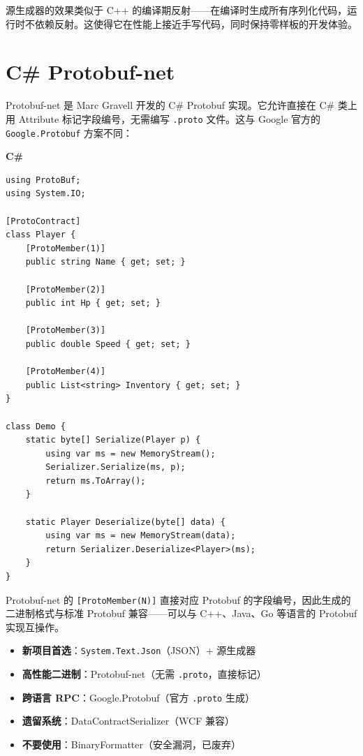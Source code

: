\documentclass[12pt,a4paper,fontset=fandol]{ctexbook}
\newcommand{\Tp}[1]{\texttt{#1}}
\newcommand{\csharplabel}{%
  \noindent\begin{tcolorbox}[colback=csharpheadbg,coltext=white,
    sharp corners,boxrule=0pt,width=3.2em,height=1.4em,
    halign=center,valign=center,nobeforeafter,left=0pt,right=0pt,
    top=0pt,bottom=0pt]\small\bfseries C\#\end{tcolorbox}}
\begin{document}
源生成器的效果类似于 C++ 的编译期反射——在编译时生成所有序列化代码，运行时不依赖反射。这使得它在性能上接近手写代码，同时保持零样板的开发体验。

\chapter{C\# Protobuf-net}\label{ch:protobuf-net}

Protobuf-net 是 Marc Gravell 开发的 C\# Protobuf 实现。它允许直接在 C\# 类上用 Attribute 标记字段编号，无需编写 \texttt{.proto} 文件。这与 Google 官方的 \Tp{Google.Protobuf} 方案不同：

\csharplabel
\begin{lstlisting}[style=csharpstyle,caption={C\#: Protobuf-net 直接标记式序列化}]
using ProtoBuf;
using System.IO;

[ProtoContract]
class Player {
    [ProtoMember(1)]
    public string Name { get; set; }

    [ProtoMember(2)]
    public int Hp { get; set; }

    [ProtoMember(3)]
    public double Speed { get; set; }

    [ProtoMember(4)]
    public List<string> Inventory { get; set; }
}

class Demo {
    static byte[] Serialize(Player p) {
        using var ms = new MemoryStream();
        Serializer.Serialize(ms, p);
        return ms.ToArray();
    }

    static Player Deserialize(byte[] data) {
        using var ms = new MemoryStream(data);
        return Serializer.Deserialize<Player>(ms);
    }
}
\end{lstlisting}

Protobuf-net 的 \texttt{[ProtoMember(N)]} 直接对应 Protobuf 的字段编号，因此生成的二进制格式与标准 Protobuf 兼容——可以与 C++、Java、Go 等语言的 Protobuf 实现互操作。

\begin{guideline}[title={C\# 序列化方案选型}]
\begin{itemize}[nosep]
  \item \textbf{新项目首选}：\Tp{System.Text.Json}（JSON）+ 源生成器
  \item \textbf{高性能二进制}：Protobuf-net（无需 \texttt{.proto}，直接标记）
  \item \textbf{跨语言 RPC}：Google.Protobuf（官方 \texttt{.proto} 生成）
  \item \textbf{遗留系统}：DataContractSerializer（WCF 兼容）
  \item \textbf{不要使用}：BinaryFormatter（安全漏洞，已废弃）
\end{itemize}
\end{guideline}
\end{document}
